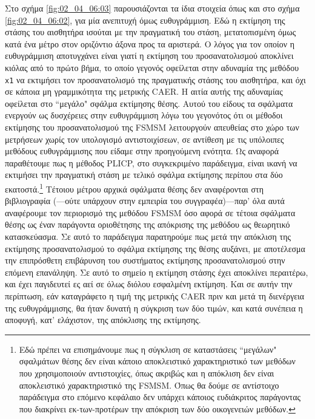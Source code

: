 Στο σχήμα \ref{fig:02_04_06:03} παρουσιάζονται τα ίδια στοιχεία όπως και στο
σχήμα \ref{fig:02_04_06:02}, για μία ανεπιτυχή όμως ευθυγράμμιση. Εδώ η
εκτίμηση της στάσης του αισθητήρα ισούται με την πραγματική του στάση,
μετατοπισμένη όμως κατά ένα μέτρο στον οριζόντιο άξονα προς τα αριστερά. Ο
λόγος για τον οποίον η ευθυγράμμιση αποτυγχάνει είναι γιατί η εκτίμηση του
προσανατολισμού αποκλίνει κιόλας από το πρώτο βήμα, το οποίο γεγονός οφείλεται
στην αδυναμία της μεθόδου \texttt{x1} να εκτιμήσει τον προσανατολισμό της
πραγματικής στάσης του αισθητήρα, και όχι σε κάποια μη γραμμικότητα της
μετρικής CAER. Η αιτία αυτής της αδυναμίας οφείλεται στο ``μεγάλο" σφάλμα
εκτίμησης θέσης. Αυτού του είδους τα σφάλματα ενεργούν ως δυσχέρειες στην
ευθυγράμμιση λόγω του γεγονότος ότι οι μέθοδοι εκτίμησης του προσανατολισμού
της FSMSM λειτουργούν απευθείας στο χώρο των μετρήσεων χωρίς τον υπολογισμό
αντιστοιχίσεων, σε αντίθεση με τις υπόλοιπες μεθόδους ευθυγράμμισης που είδαμε
στην προηγούμενη ενότητα. Ως αναφορά παραθέτουμε πως η μέθοδος PLICP, στο
συγκεκριμένο παράδειγμα, είναι ικανή να εκτιμήσει την πραγματική στάση με
τελικό σφάλμα εκτίμησης περίπου στα δύο εκατοστά.\footnote{Εδώ πρέπει να
επισημάνουμε πως η σύγκλιση σε καταστάσεις ``μεγάλων" σφαλμάτων θέσης δεν είναι
κάποιο αποκλειστικό χαρακτηριστικό των μεθόδων που χρησιμοποιούν αντιστοιχίες,
όπως ακριβώς και η απόκλιση δεν είναι αποκλειστικό χαρακτηριστικό της FSMSM.
Όπως θα δούμε σε αντίστοιχο παράδειγμα στο επόμενο κεφάλαιο δεν υπάρχει κάποιος
ευδιάκριτος παράγοντας που διακρίνει εκ-των-προτέρων την απόκριση των δύο
οικογενειών μεθόδων.} Τέτοιου μέτρου αρχικά σφάλματα θέσης δεν αναφέρονται στη
βιβλιογραφία (---ούτε υπάρχουν στην εμπειρία του συγγραφέα)---παρ' όλα αυτά
αναφέρουμε τον περιορισμό της μεθόδου FSMSM όσο αφορά σε τέτοια σφάλματα θέσης
ως έναν παράγοντα οριοθέτησης της απόκρισης της μεθόδου ως θεωρητικό
κατασκεύασμα. Σε αυτό το παράδειγμα παρατηρούμε πως μετά την απόκλιση της
εκτίμησης προσανατολισμού το σφάλμα εκτίμησης της θέσης αυξάνει, με αποτέλεσμα
την επιπρόσθετη επιβάρυνση του συστήματος εκτίμησης προσανατολισμού στην
επόμενη επανάληψη. Σε αυτό το σημείο η εκτίμηση στάσης έχει αποκλίνει περαιτέρω,
και έχει παγιδευτεί ες αεί σε όλως διόλου εσφαλμένη εκτίμηση. Και σε αυτήν την
περίπτωση, εάν καταγράφετο η τιμή της μετρικής CAER πριν και μετά τη διενέργεια
της ευθυγράμμισης, θα ήταν δυνατή η σύγκριση των δύο τιμών, και κατά συνέπεια
η αποφυγή, κατ' ελάχιστον, της απόκλισης της εκτίμησης.

